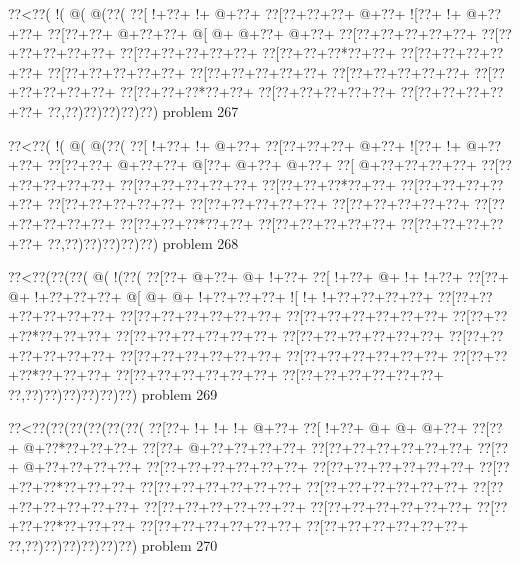 \vbox{\vbox{\goo
\0??<\0??(\- !(\- @(\- @(\0??(
\0??[\- !+\0??+\- !+\- @+\0??+
\0??[\0??+\0??+\0??+\- @+\0??+
\- ![\0??+\- !+\- @+\0??+\0??+
\0??[\0??+\0??+\- @+\0??+\0??+
\- @[\- @+\- @+\0??+\- @+\0??+
\0??[\0??+\0??+\0??+\0??+\0??+
\0??[\0??+\0??+\0??+\0??+\0??+
\0??[\0??+\0??+\0??+\0??+\0??+
\0??[\0??+\0??+\0??*\0??+\0??+
\0??[\0??+\0??+\0??+\0??+\0??+
\0??[\0??+\0??+\0??+\0??+\0??+
\0??[\0??+\0??+\0??+\0??+\0??+
\0??[\0??+\0??+\0??+\0??+\0??+
\0??[\0??+\0??+\0??+\0??+\0??+
\0??[\0??+\0??+\0??*\0??+\0??+
\0??[\0??+\0??+\0??+\0??+\0??+
\0??[\0??+\0??+\0??+\0??+\0??+
\0??,\0??)\0??)\0??)\0??)\0??)
}
\hfil problem 267\hfil\break
}

\vbox{\vbox{\goo
\0??<\0??(\- !(\- @(\- @(\0??(
\0??[\- !+\0??+\- !+\- @+\0??+
\0??[\0??+\0??+\0??+\- @+\0??+
\- ![\0??+\- !+\- @+\0??+\0??+
\0??[\0??+\0??+\- @+\0??+\0??+
\- @[\0??+\- @+\0??+\- @+\0??+
\0??[\- @+\0??+\0??+\0??+\0??+
\0??[\0??+\0??+\0??+\0??+\0??+
\0??[\0??+\0??+\0??+\0??+\0??+
\0??[\0??+\0??+\0??*\0??+\0??+
\0??[\0??+\0??+\0??+\0??+\0??+
\0??[\0??+\0??+\0??+\0??+\0??+
\0??[\0??+\0??+\0??+\0??+\0??+
\0??[\0??+\0??+\0??+\0??+\0??+
\0??[\0??+\0??+\0??+\0??+\0??+
\0??[\0??+\0??+\0??*\0??+\0??+
\0??[\0??+\0??+\0??+\0??+\0??+
\0??[\0??+\0??+\0??+\0??+\0??+
\0??,\0??)\0??)\0??)\0??)\0??)
}
\hfil problem 268\hfil\break
}

\vbox{\vbox{\goo
\0??<\0??(\0??(\0??(\- @(\- !(\0??(
\0??[\0??+\- @+\0??+\- @+\- !+\0??+
\0??[\- !+\0??+\- @+\- !+\- !+\0??+
\0??[\0??+\- @+\- !+\0??+\0??+\0??+
\- @[\- @+\- @+\- !+\0??+\0??+\0??+
\- ![\- !+\- !+\0??+\0??+\0??+\0??+
\0??[\0??+\0??+\0??+\0??+\0??+\0??+
\0??[\0??+\0??+\0??+\0??+\0??+\0??+
\0??[\0??+\0??+\0??+\0??+\0??+\0??+
\0??[\0??+\0??+\0??*\0??+\0??+\0??+
\0??[\0??+\0??+\0??+\0??+\0??+\0??+
\0??[\0??+\0??+\0??+\0??+\0??+\0??+
\0??[\0??+\0??+\0??+\0??+\0??+\0??+
\0??[\0??+\0??+\0??+\0??+\0??+\0??+
\0??[\0??+\0??+\0??+\0??+\0??+\0??+
\0??[\0??+\0??+\0??*\0??+\0??+\0??+
\0??[\0??+\0??+\0??+\0??+\0??+\0??+
\0??[\0??+\0??+\0??+\0??+\0??+\0??+
\0??,\0??)\0??)\0??)\0??)\0??)\0??)
}
\hfil problem 269\hfil\break
}

\vbox{\vbox{\goo
\0??<\0??(\0??(\0??(\0??(\0??(\0??(
\0??[\0??+\- !+\- !+\- !+\- @+\0??+
\0??[\- !+\0??+\- @+\- @+\- @+\0??+
\0??[\0??+\- @+\0??*\0??+\0??+\0??+
\0??[\0??+\- @+\0??+\0??+\0??+\0??+
\0??[\0??+\0??+\0??+\0??+\0??+\0??+
\0??[\0??+\- @+\0??+\0??+\0??+\0??+
\0??[\0??+\0??+\0??+\0??+\0??+\0??+
\0??[\0??+\0??+\0??+\0??+\0??+\0??+
\0??[\0??+\0??+\0??*\0??+\0??+\0??+
\0??[\0??+\0??+\0??+\0??+\0??+\0??+
\0??[\0??+\0??+\0??+\0??+\0??+\0??+
\0??[\0??+\0??+\0??+\0??+\0??+\0??+
\0??[\0??+\0??+\0??+\0??+\0??+\0??+
\0??[\0??+\0??+\0??+\0??+\0??+\0??+
\0??[\0??+\0??+\0??*\0??+\0??+\0??+
\0??[\0??+\0??+\0??+\0??+\0??+\0??+
\0??[\0??+\0??+\0??+\0??+\0??+\0??+
\0??,\0??)\0??)\0??)\0??)\0??)\0??)
}
\hfil problem 270\hfil\break
}


